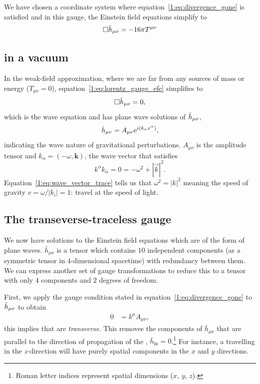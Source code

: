 We have chosen a coordinate system where equation~\ref{1:eq:divergence_gone} is satisfied and in this gauge, the Einstein field equations simplify to
%
\begin{equation}
    \Box \Bar{h}_{\mu\nu} = -16 \pi T^{\mu\nu}
    \label{1:eq:lorentz_gauge_efe}
\end{equation}
%

\subsection{\label{1:sec:gw_in_vacuum}\Gws in a vacuum}

In the weak-field approximation, where we are far from any sources of mass or energy ($T_{\mu\nu} = 0$), equation~\ref{1:eq:lorentz_gauge_efe} simplifies to
%
\begin{equation}
    \Box \Bar{h}_{\mu\nu} = 0,
\end{equation}
%
which is the wave equation and has plane wave solutions of $\Bar{h}_{\mu\nu}$,
%
\begin{equation}
    \Bar{h}_{\mu\nu} = A_{\mu\nu} {\rm e}^{i(k_\alpha x^\alpha)},
\end{equation}
%
indicating the wave nature of gravitational perturbations. $A_{\mu\nu}$ is the amplitude tensor and $k_\alpha = (-\omega, \textbf{k})$, the wave vector that satisfies
%
\begin{equation}
    k^{\alpha} k_{\alpha} = 0 = -\omega^{2} + |\vec{k}|^{2}.
    \label{1:eq:wave_vector_trace}
\end{equation}
%
Equation~\ref{1:eq:wave_vector_trace} tells us that $\omega^{2} = |k|^{2}$ meaning the speed of gravity $v = \omega / |k_{i}| = 1$: \gws travel at the speed of light. 

\subsection{\label{1:sec:TT_gauge}The transeverse-traceless gauge}

We now have solutions to the Einstein field equations which are of the form of plane waves. $\bar{h}_{\mu\nu}$ is a tensor which contains $10$ independent components (as a symmetric tensor in $4$-dimensional spacetime) with redundancy between them. We can express another set of gauge transformations to reduce this to a tensor with only $4$ components and $2$ degrees of freedom.

First, we apply the gauge condition stated in equation~\ref{1:eq:divergence_gone} to $\Bar{h}_{\mu\nu}$ to obtain
%
\begin{align}
    0 &= k^{\mu} A_{\mu\nu},
\end{align}
%
this implies that \gws are \textit{transverse}. This removes the components of $\bar{h}_{\mu\nu}$ that are parallel to the direction of propagation of the \gw, $\bar{h}_{0i} = 0$.\footnote{Roman letter indices represent spatial dimensions ($x$, $y$, $z$).} For instance, a \gw travelling in the $z$-direction will have purely spatial components in the $x$ and $y$ directions.

